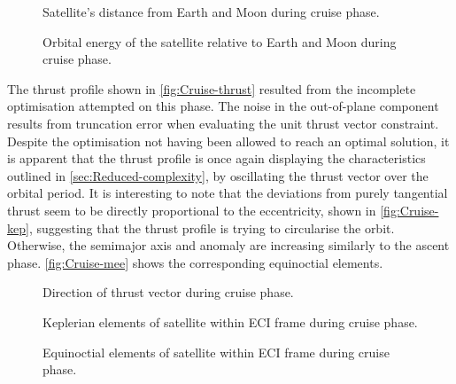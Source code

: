 \begin{figure}
\centering
\def\svgwidth{\figurewidth}

\caption{Satellite's distance from Earth and Moon during cruise phase.} \label{fig:Cruise-dist}
\end{figure}

\begin{figure}
\centering
\def\svgwidth{\figurewidth}

\caption{Orbital energy of the satellite relative to Earth and Moon during cruise phase.} \label{fig:Cruise-orbeng}
\end{figure}

The thrust profile shown in \autoref{fig:Cruise-thrust} resulted from the incomplete optimisation attempted on this phase. The noise in the out-of-plane component results from truncation error when evaluating the unit thrust vector constraint. Despite the optimisation not having been allowed to reach an optimal solution, it is apparent that the thrust profile is once again displaying the characteristics outlined in \autoref{sec:Reduced-complexity}, by oscillating the thrust vector over the orbital period. It is interesting to note that the deviations from purely tangential thrust seem to be directly proportional to the eccentricity, shown in \autoref{fig:Cruise-kep}, suggesting that the thrust profile is trying to circularise the orbit. Otherwise, the semimajor axis and anomaly are increasing similarly to the ascent phase. \autoref{fig:Cruise-mee} shows the corresponding equinoctial elements.

\begin{figure}
\centering
\def\svgwidth{\figurewidth}

\caption{Direction of thrust vector during cruise phase.} \label{fig:Cruise-thrust}
\end{figure}

\begin{figure}
\centering
\def\svgwidth{\figurewidth}

\caption{Keplerian elements of satellite within ECI frame during cruise phase.} \label{fig:Cruise-kep}
\end{figure}

\begin{figure}
\centering
\def\svgwidth{\figurewidth}

\caption{Equinoctial elements of satellite within ECI frame during cruise phase.} \label{fig:Cruise-mee}
\end{figure}

